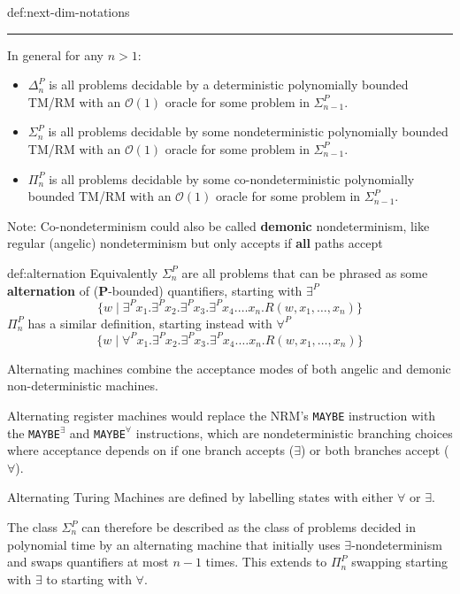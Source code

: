 \documentclass[landscape, 8pt]{extarticle}
\begin{document}
\begin{multicols}{3}
\begin{dfn}{def:next-dim-notations}{}
\vspace{-5pt}
\noindent\rule{\textwidth}{0.2pt}
In general for any $n>1$:
\begin{itemize}
    \item $\Delta_n^P$ is all problems decidable by a deterministic polynomially bounded TM/RM with an $\mathcal{O}(1)$ oracle for some problem in $\Sigma_{n-1}^P$.
    \item $\Sigma_n^P$ is all problems decidable by some nondeterministic polynomially bounded TM/RM with an $\mathcal{O}(1)$ oracle for some problem in $\Sigma_{n-1}^P$.
    \item $\Pi_n^P$ is all problems decidable by some co-nondeterministic polynomially bounded TM/RM with an $\mathcal{O}(1)$ oracle for some problem in $\Sigma_{n-1}^P$.
\end{itemize}
Note: Co-nondeterminism could also be called \textbf{demonic} nondeterminism, like regular (angelic) nondeterminism but only accepts if \textbf{all} paths accept
\end{dfn}


\begin{dfn}[Alternation]{def:alternation}{}
Equivalently $\Sigma^{P}_{n}$ are all problems that can be phrased as some \textbf{alternation} of (\textbf{P}-bounded) quantifiers, starting with $\exists^{P}$
\[\{ w \mid \exists^{P} x_{1} . \exists^{P} x_{2} . \exists^{P} x_{3} . \exists^{P} x_{4} . \dots x_{n} . R(w, x_{1}, \dots, x_{n})\}\]
$\Pi_n^P$ has a similar definition, starting instead with $\forall^P$
\[\{ w \mid \forall^{P} x_{1} . \exists^{P} x_{2} . \exists^{P} x_{3} . \exists^{P} x_{4} . \dots x_{n} . R(w, x_{1}, \dots, x_{n})\}\]

Alternating machines combine the acceptance modes of both angelic and demonic non-deterministic machines.

Alternating register machines would replace the NRM's \texttt{MAYBE} instruction with the \texttt{MAYBE}$^\exists$ and \texttt{MAYBE}$^\forall$ instructions, which are nondeterministic branching choices where acceptance depends on if one branch accepts ($\exists$) or both branches accept ($\forall$).

Alternating Turing Machines are defined by labelling states
with either $\forall$ or $\exists$.

The class $\Sigma_n^P$ can therefore be described as the class of problems decided in polynomial time by an alternating machine that initially uses $\exists$-nondeterminism and swaps quantifiers at most $n-1$ times. This extends to $\Pi_n^P$ swapping starting with $\exists$ to starting with $\forall$.
\end{dfn}



\end{multicols}
\end{document}
